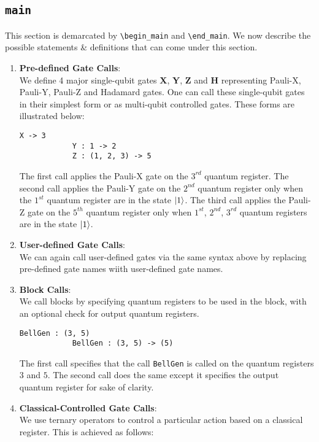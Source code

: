 \documentclass{article}
\begin{document}
\subsection{\texttt{main}}
This section is demarcated by \texttt{\textbackslash begin\_main} and \texttt{\textbackslash end\_main}. We now describe the possible statements \& definitions that can come under this section.
\begin{enumerate}
	\item \textbf{Pre-defined Gate Calls}: \\
		We define 4 major single-qubit gates \textbf{X}, \textbf{Y}, \textbf{Z} and \textbf{H} representing Pauli-X, Pauli-Y, Pauli-Z and Hadamard gates. One can call these single-qubit gates in their simplest form or as multi-qubit controlled gates. These forms are illustrated below:
		\begin{lstlisting}[caption=Predefined Gate Calls]
			X -> 3
			Y : 1 -> 2
			Z : (1, 2, 3) -> 5
		\end{lstlisting}
		The first call applies the Pauli-X gate on the $3^{rd}$ quantum register. The second call applies the Pauli-Y gate on the $2^{nd}$ quantum register only when the $1^{st}$ quantum register are in the state $\ket{1}$. The third call applies the Pauli-Z gate on the $5^{th}$ quantum register only when $1^{st}$, $2^{nd}$, $3^{rd}$ quantum registers are in the state $\ket{1}$.
	\item \textbf{User-defined Gate Calls}: \\
		We can again call user-defined gates via the same syntax above by replacing pre-defined gate names wiith user-defined gate names.
	\item \textbf{Block Calls}: \\
		We call blocks by specifying quantum registers to be used in the block, with an optional check for output quantum registers.
		\begin{lstlisting}[caption=Block Calls]
			BellGen : (3, 5)
			BellGen : (3, 5) -> (5)
		\end{lstlisting}
		The first call specifies that the call \texttt{BellGen} is called on the quantum registers $3$ and $5$. The second call does the same except it specifies the output quantum register for sake of clarity.
	\item \textbf{Classical-Controlled Gate Calls}: \\
		We use ternary operators to control a particular action based on a classical register. This is achieved as follows:
		\begin{lstlisting}[caption=Classical-Controlled Gate Calls]

\end{lstlisting}
\end{enumerate}
\end{document}
